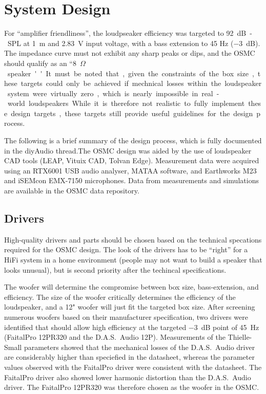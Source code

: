 \documentclass[12pt,a4paper]{article}
\providecommand{\seclabel}[1]{\label{sec:#1}}
\begin{document}
\clearpage


\section{System Design}

For ``amplifier friendliness'', the loudpseaker efficiency was targeted to \SI{92}{dB-SPL} at \SI{1}{m} and \SI{2.83}{V} input voltage, with a bass extension to 45 Hz (\SI{-3}{dB}). The impedance curve must not exhibit any sharp peaks or dips, and the OSMC should qualify as an ``\SI{8}{$\Omega$} speaker''. It must be noted that, given the constraints of the box size, these targets could only be achieved if mechnical losses within the loudspeaker system were virtually zero, which is nearly impossible in real-world loudspeakers. While it is therefore not realistic to fully implement these design targets, these targets still provide useful guidelines for the design process.\par

The following is a brief summary of the design process, which is fully documented in the diyAudio thread.\cite{osmc_p1}The OSMC design was aided by the use of loudspeaker CAD tools (LEAP, Vituix CAD, Tolvan Edge). Measurement data were acquired using an RTX6001 USB audio analyser, MATAA software, and Earthworks M23 and iSEMcon EMX-7150 microphones. Data from measurements and simulations are available in the OSMC data repository\cite{osmc_datarepo}.


\subsection{Drivers}\seclabel{drivers}

High-quality drivers and parts should be chosen based on the technical specations required for the OSMC design. The look of the drivers has to be ``right'' for a HiFi system in a home environment (people may not want to build a speaker that looks unusual), but is second priority after the techincal specifications.

The woofer will determine the compromise between box size, bass-extension, and efficiency. 
The size of the woofer critically determines the efficiency of the loudspeaker, and a 12" woofer will just fit the targeted box size. After screening numerous woofers based on their manufacturer specification, two drivers were identified that should allow high efficiency at the targeted \SI{-3}{dB} point of \SI{45}{Hz} (FaitalPro 12PR320 and the D.A.S.~Audio 12P)\cite{osmc_p162}. Measurements of the Thielle-Small parameters showed that the mechanical losses of the D.A.S.~Audio driver are considerably higher than speciefied in the datasheet, whereas the parameter values observed with the FaitalPro driver were consistent with the datasheet. The FaitalPro driver also showed lower harmonic distortion than the D.A.S.~Audio driver\cite{osmc_p236}. The FaitalPro 12PR320 was therefore chosen as the woofer in the OSMC.
\end{document}
